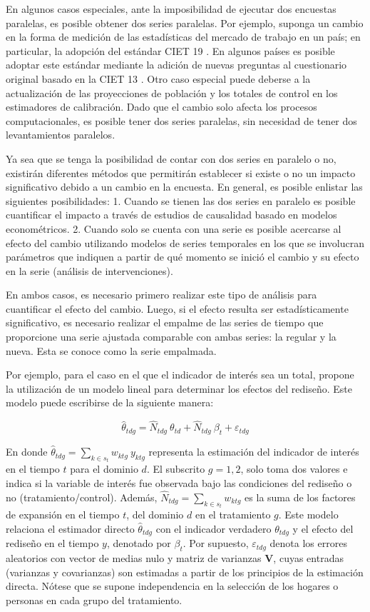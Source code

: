 \documentclass[
  12pt,
]{book}
\begin{document}
En algunos casos especiales, ante la imposibilidad de ejecutar dos encuestas paralelas, es posible obtener dos series paralelas. Por ejemplo, suponga un cambio en la forma de medición de las estadísticas del mercado de trabajo en un país; en particular, la adopción del estándar CIET 19 \citep{ILO_2013}. En algunos países es posible adoptar este estándar mediante la adición de nuevas preguntas al cuestionario original basado en la CIET 13 \citep{ILO_1982}. Otro caso especial puede deberse a la actualización de las proyecciones de población y los totales de control en los estimadores de calibración. Dado que el cambio solo afecta los procesos computacionales, es posible tener dos series paralelas, sin necesidad de tener dos levantamientos paralelos.

Ya sea que se tenga la posibilidad de contar con dos series en paralelo o no, existirán diferentes métodos que permitirán establecer si existe o no un impacto significativo debido a un cambio en la encuesta. En general, es posible enlistar las siguientes posibilidades:
1. Cuando se tienen las dos series en paralelo es posible cuantificar el impacto a través de estudios de causalidad basado en modelos econométricos.
2. Cuando solo se cuenta con una serie es posible acercarse al efecto del cambio utilizando modelos de series temporales en los que se involucran parámetros que indiquen a partir de qué momento se inició el cambio y su efecto en la serie (análisis de intervenciones).

En ambos casos, es necesario primero realizar este tipo de análisis para cuantificar el efecto del cambio. Luego, si el efecto resulta ser estadísticamente significativo, es necesario realizar el empalme de las series de tiempo que proporcione una serie ajustada comparable con ambas series: la regular y la nueva. Esta se conoce como la serie empalmada.

Por ejemplo, para el caso en el que el indicador de interés sea un total, \citet{Gbur} propone la utilización de un modelo lineal para determinar los efectos del rediseño. Este modelo puede escribirse de la siguiente manera:

\[
\hat \theta_{tdg} = \hat N_{tdg} \ \theta_{td} + \hat N_{tdg} \ \beta_{t} + \varepsilon_{tdg} 
\]

En donde \(\hat \theta_{tdg} = \sum_{k \in s_t} w_{ktg} \ y_{ktg}\) representa la estimación del indicador de interés en el tiempo \(t\) para el dominio \(d\). El subscrito \(g = 1, 2\), solo toma dos valores e indica si la variable de interés fue observada bajo las condiciones del rediseño o no (tratamiento/control). Además, \(\hat N_{tdg} = \sum_{k \in s_t} w_{ktg}\) es la suma de los factores de expansión en el tiempo \(t\), del dominio \(d\) en el tratamiento \(g\). Este modelo relaciona el estimador directo \(\hat \theta_{tdg}\) con el indicador verdadero \(\theta_{tdg}\) y el efecto del rediseño en el tiempo \(y\), denotado por \(\beta_{t}\). Por supuesto, \(\varepsilon_{tdg}\) denota los errores aleatorios con vector de medias nulo y matriz de varianzas \(\boldsymbol V\), cuyas entradas (varianzas y covarianzas) son estimadas a partir de los principios de la estimación directa. Nótese que se supone independencia en la selección de los hogares o personas en cada grupo del tratamiento.
\end{document}
